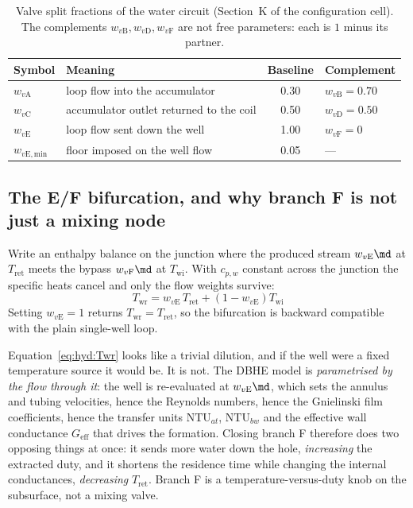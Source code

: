 \begin{table}[htbp]
\centering
\caption{Valve split fractions of the water circuit (Section~K of the
configuration cell). The complements $w_{v\mathrm{B}},w_{v\mathrm{D}},
w_{v\mathrm{F}}$ are not free parameters: each is $1$ minus its partner.}
\label{tab:hyd:valves}
\begin{tabular}{llS[table-format=1.2]l}
\toprule
Symbol & Meaning & {Baseline} & Complement \\
\midrule
$w_{v\mathrm{A}}$ & loop flow into the accumulator & 0.30 & $w_{v\mathrm{B}}=0.70$ \\
$w_{v\mathrm{C}}$ & accumulator outlet returned to the coil & 0.50 & $w_{v\mathrm{D}}=0.50$ \\
$w_{v\mathrm{E}}$ & loop flow sent down the well & 1.00 & $w_{v\mathrm{F}}=0$ \\
$w_{v\mathrm{E,min}}$ & floor imposed on the well flow & 0.05 & --- \\
\bottomrule
\end{tabular}
\end{table}

\subsection{The E/F bifurcation, and why branch F is not just a mixing node}
\label{sec:hyd:EF}

Write an enthalpy balance on the junction where the produced stream $w_{v\mathrm{E}}\md$ at
$T_{\mathrm{ret}}$ meets the bypass $w_{v\mathrm{F}}\md$ at $T_{\mathrm{wi}}$. With $c_{p,w}$
constant across the junction the specific heats cancel and only the flow weights survive:
\begin{equation}
\boxed{\;T_{\mathrm{wr}}=w_{v\mathrm{E}}\,T_{\mathrm{ret}}
+\left(1-w_{v\mathrm{E}}\right)T_{\mathrm{wi}}\;}
\label{eq:hyd:Twr}
\end{equation}
Setting $w_{v\mathrm{E}}=1$ returns $T_{\mathrm{wr}}=T_{\mathrm{ret}}$, so the bifurcation is
backward compatible with the plain single-well loop.

Equation~\eqref{eq:hyd:Twr} looks like a trivial dilution, and if the well were a fixed
temperature source it would be. It is not. The DBHE model is \emph{parametrised by the flow
through it}: the well is re-evaluated at $w_{v\mathrm{E}}\md$, which sets the annulus and
tubing velocities, hence the Reynolds numbers, hence the Gnielinski film coefficients, hence
the transfer units $\mathrm{NTU}_{at}$, $\mathrm{NTU}_{bw}$ and the effective wall conductance
$G_{\mathrm{eff}}$ that drives the formation. Closing branch F therefore does two opposing
things at once: it sends more water down the hole, \emph{increasing} the extracted duty, and it
shortens the residence time while changing the internal conductances, \emph{decreasing}
$T_{\mathrm{ret}}$. Branch F is a temperature-versus-duty knob on the subsurface, not a mixing
valve.

